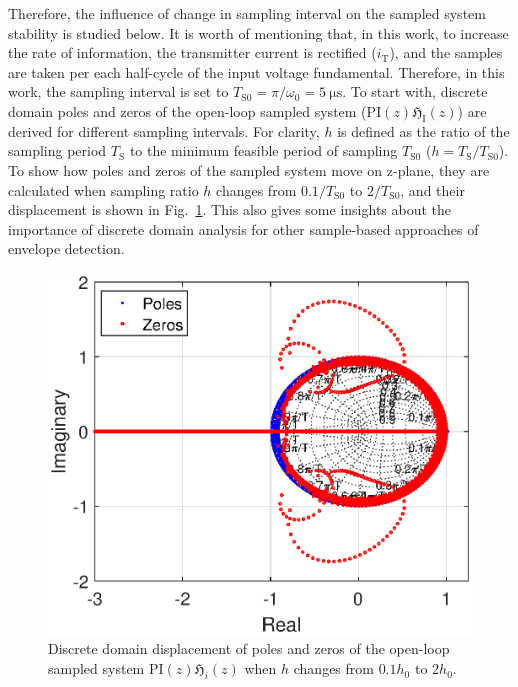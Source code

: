 \documentclass[journal,a4paper,10pt,twoside]{IEEEtran} %
\begin{document}
	 Therefore, the influence of change in sampling interval on the sampled system stability is studied below. It is worth of mentioning that, in this work, to increase the rate of information, the transmitter current is rectified ($i_\mathrm{T}$), and the samples are taken per each half-cycle of the input voltage fundamental. Therefore, in this work, the sampling interval is set to $T_{\mathrm{S}0}=\pi/\omega_0=5~\mathrm{\mu s}$. 
	 To start with, discrete domain poles and zeros of the open-loop sampled system ($\mathrm{PI}(z)\mathfrak{H}_\mathrm{I}(z)$) are derived for different sampling intervals. For clarity, $h$ is defined as the ratio of the sampling period $T_\mathrm{S}$ to the minimum feasible period of sampling $T_{\mathrm{S}0}$ ($h={T_\mathrm{S}}/{T_{\mathrm{S}0}}$). 
	 To show how poles and zeros of the sampled system move on z-plane, they are calculated when sampling ratio $h$ changes from $0.1/T_\mathrm{S0}$ to $2/T_\mathrm{S0}$, and their displacement is shown in Fig.~\ref{FIG18}. This also gives some insights about the importance of discrete domain analysis for other sample-based approaches of envelope detection.
	 
	 \begin{figure}
	     \centering
	     \includegraphics[clip, trim=1cm 0.1cm 1cm -0.1cm, width=1\columnwidth]{FIGS/FIG18.eps}
	     \caption{Discrete domain displacement of poles and zeros of the open-loop sampled system $\mathrm{PI}(z)\mathfrak{H}_i(z)$ when $h$ changes from $0.1h_0$ to $2h_0$.}
	     \label{FIG18}
	     \vspace{-3mm}
	 \end{figure}
	 
\end{document}

